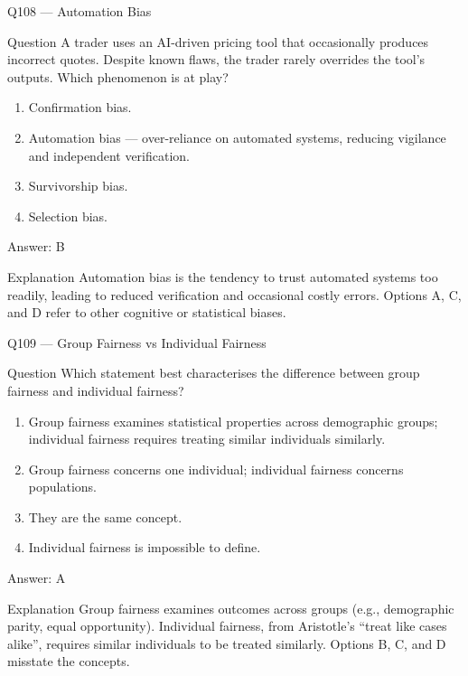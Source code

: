 \documentclass[aspectratio=169,8pt]{beamer}
\begin{document}
\begin{frame}{Q108 --- Automation Bias}
\begin{block}{Question}
A trader uses an AI-driven pricing tool that occasionally produces incorrect quotes. Despite known flaws, the trader rarely overrides the tool's outputs. Which phenomenon is at play?
\end{block}
\begin{enumerate}
\item Confirmation bias.
\item Automation bias --- over-reliance on automated systems, reducing vigilance and independent verification.
\item Survivorship bias.
\item Selection bias.
\end{enumerate}
\begin{exampleblock}{Answer: B}\end{exampleblock}
\begin{block}{Explanation}
Automation bias is the tendency to trust automated systems too readily, leading to reduced verification and occasional costly errors. Options A, C, and D refer to other cognitive or statistical biases.
\end{block}
\end{frame}

\begin{frame}{Q109 --- Group Fairness vs Individual Fairness}
\begin{block}{Question}
Which statement best characterises the difference between group fairness and individual fairness?
\end{block}
\begin{enumerate}
\item Group fairness examines statistical properties across demographic groups; individual fairness requires treating similar individuals similarly.
\item Group fairness concerns one individual; individual fairness concerns populations.
\item They are the same concept.
\item Individual fairness is impossible to define.
\end{enumerate}
\begin{exampleblock}{Answer: A}\end{exampleblock}
\begin{block}{Explanation}
Group fairness examines outcomes across groups (e.g., demographic parity, equal opportunity). Individual fairness, from Aristotle's ``treat like cases alike'', requires similar individuals to be treated similarly. Options B, C, and D misstate the concepts.
\end{block}
\end{frame}
\end{document}
